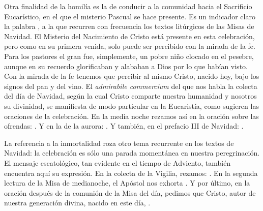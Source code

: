 \begin{body}
\begin{body}
Otra finalidad de la homilía es la de conducir a la comunidad hacia el Sacrificio Eucarístico, en el que el misterio Pascual se hace presente. Es un indicador claro la palabra , a la que recurren con frecuencia los textos litúrgicos de las Misas de Navidad. El Misterio del Nacimiento de Cristo está presente en esta celebración, pero como en su primera venida, solo puede ser percibido con la mirada de la fe. Para los pastores el gran  fue, simplemente, un pobre niño clocado en el pesebre, aunque en su recuerdo glorificaban y alababan a Dios por lo que habían visto. Con la mirada de la fe tenemos que percibir al mismo Cristo, nacido hoy, bajo los signos del pan y del vino. El \emph{admirabile commercium} del que nos habla la colecta del día de Navidad, según la cual Cristo comparte nuestra humanidad y nosotros su divinidad, se manifiesta de modo particular en la Eucaristía, como sugieren las oraciones de la celebración. En la media noche rezamos así en la oración sobre las ofrendas: . Y en la de la aurora: . Y también, en el prefacio III de Navidad: .

La referencia a la inmortalidad roza otro tema recurrente en los textos de Navidad: la celebración es sólo una parada momentánea en nuestra peregrinación. El mensaje escatológico, tan evidente en el tiempo de Adviento, también encuentra aquí su expresión. En la colecta de la Vigilia, rezamos: . En la segunda lectura de la Misa de medianoche, el Apóstol nos exhorta . Y por último, en la oración después de la comunión de la Misa del día, pedimos que Cristo, autor de nuestra generación divina, nacido en este día, .


\end{body}
\end{body}
